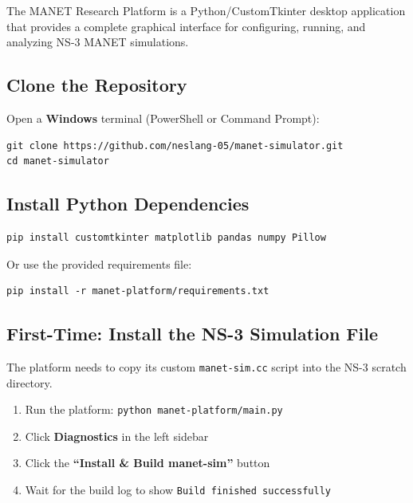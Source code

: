 \documentclass[12pt,a4paper]{article}
\newcommand{\cmd}[1]{\texttt{\color{codeblue}#1}}
\newcommand{\file}[1]{\texttt{\color{codered}#1}}
\begin{document}
The MANET Research Platform is a Python/CustomTkinter desktop application that provides a complete graphical interface for configuring, running, and analyzing NS-3 MANET simulations.

\subsection{Clone the Repository}

Open a \textbf{Windows} terminal (PowerShell or Command Prompt):

\begin{lstlisting}[style=bash, caption={Clone the MANET Research Platform (Windows PowerShell)}]
git clone https://github.com/neslang-05/manet-simulator.git
cd manet-simulator
\end{lstlisting}

\subsection{Install Python Dependencies}

\begin{lstlisting}[style=bash, caption={Install Python packages (Windows PowerShell)}]
pip install customtkinter matplotlib pandas numpy Pillow
\end{lstlisting}

Or use the provided requirements file:

\begin{lstlisting}[style=bash, caption={Install from requirements.txt}]
pip install -r manet-platform/requirements.txt
\end{lstlisting}

\subsection{First-Time: Install the NS-3 Simulation File}

The platform needs to copy its custom \file{manet-sim.cc} script into the NS-3 scratch directory.

\begin{enumerate}[leftmargin=1.5em]
  \item Run the platform: \cmd{python manet-platform/main.py}
  \item Click \textbf{Diagnostics} in the left sidebar
  \item Click the \textbf{``Install \& Build manet-sim''} button
  \item Wait for the build log to show \texttt{Build finished successfully}
\end{enumerate}
\end{document}
